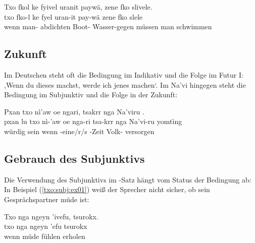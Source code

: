\begin{interlin}
	\glll \Npawl{}Txo fkol ke fyivel uranit paywä, zene fko slivele. \\
	txo fko-l ke fyel uran-it pay-wä zene fko slele \\
	wenn man-  abdichten Boot- Wasser-gegen müssen man schwimmen \\
\end{interlin}

\subsection{Zukunft} Im Deutschen steht oft die Bedingung im Indikativ und die Folge im Futur I: ,Wenn du dieses machst, werde ich jenes machen‘. Im Na'vi hingegen steht die Bedingung im Subjunktiv und die Folge in der Zukunft:

\begin{interlin}
	\glll \Npawl{}Pxan  txo nì'aw oe ngari, tsakrr nga Na'viru . \\
	pxan lu txo nì-'aw oe nga-ri tsa-krr nga Na'vi-ru yomtìng \\
	würdig sein wenn -eine/r/s   -Zeit  Volk- versorgen \\
\end{interlin}

\subsection{Gebrauch des Subjunktivs} 
Die Verwendung des Subjunktivs im -Satz hängt vom Status der Bedingung ab: In Beispiel (\ref{txo:subj:ex01}) weiß der Sprecher nicht sicher, ob sein Gesprächspartner müde ist:

\begin{interlin} \label{txo:subj:ex01}
	\glll \Npawl{}Txo nga ngeyn 'ivefu, tsurokx. \\
	txo nga ngeyn 'efu tsurokx \\ 
	wenn  müde fühlen erholen \\
\end{interlin}

